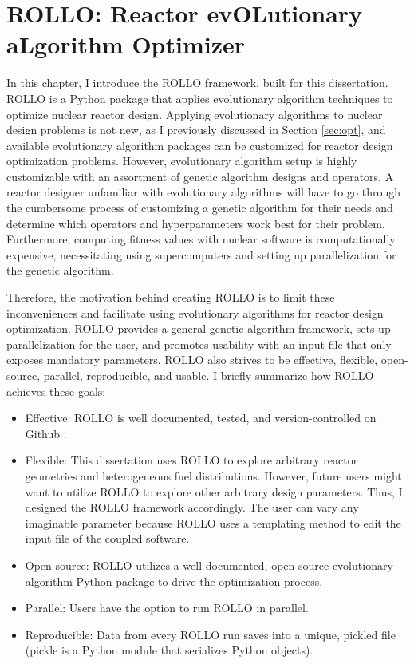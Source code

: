 \chapter{ROLLO: Reactor evOLutionary aLgorithm Optimizer}
\label{chap:rollo}
In this chapter, I introduce the \gls{ROLLO} framework, built 
for this dissertation. 
\gls{ROLLO} is a Python package that applies evolutionary algorithm 
techniques to optimize nuclear reactor design. 
Applying evolutionary algorithms to nuclear design problems is not new, as I
previously discussed in Section \ref{sec:opt}, and available evolutionary algorithm 
packages can be customized for reactor design optimization problems. 
However, evolutionary algorithm setup is highly customizable with
an assortment of genetic algorithm designs and operators.
A reactor designer unfamiliar with evolutionary algorithms will have
to go through the cumbersome process of customizing a genetic algorithm 
for their needs and determine which operators and hyperparameters work best for 
their problem. 
Furthermore, computing fitness values with nuclear software is computationally 
expensive, necessitating using supercomputers and setting up parallelization 
for the genetic algorithm.

Therefore, the motivation behind creating \gls{ROLLO} is to limit these inconveniences and 
facilitate using evolutionary algorithms for reactor design optimization.
\gls{ROLLO} provides a general genetic algorithm framework, sets up 
parallelization for the user, and promotes usability with an input file 
that only exposes mandatory parameters.
\gls{ROLLO} also strives to be effective, flexible, open-source, parallel, reproducible, 
and usable. 
I briefly summarize how \gls{ROLLO} achieves these goals:  
\begin{itemize}
    \item Effective: \gls{ROLLO} is well documented, tested, and 
    version-controlled on Github \cite{chee_rollo_2021}.
    \item Flexible: This dissertation uses \gls{ROLLO} to 
    explore arbitrary reactor geometries and heterogeneous fuel distributions. 
    However, future users might want to utilize \gls{ROLLO} 
    to explore other arbitrary design parameters. Thus, I designed the \gls{ROLLO}
    framework accordingly. The user can vary any imaginable parameter 
    because \gls{ROLLO} uses a templating method to edit the input file of the 
    coupled software.
    \item Open-source: \gls{ROLLO} utilizes a well-documented, open-source 
    evolutionary algorithm Python package to drive the optimization process.
    \item Parallel: Users have the option to run \gls{ROLLO} in parallel.
    \item Reproducible: Data from every \gls{ROLLO} run saves into a unique, pickled 
    file (pickle is a Python module that serializes Python objects).
\end{itemize}

